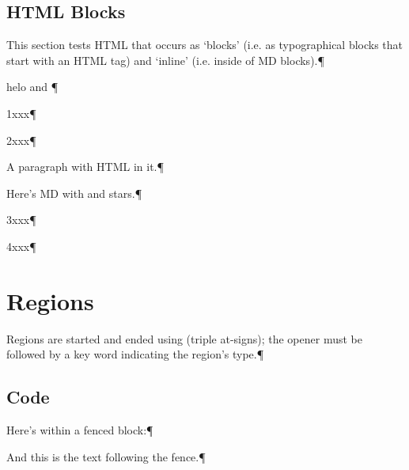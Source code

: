 

\section{HTML Blocks
}
This section tests HTML that occurs as ‘blocks’ (i.e. as typographical blocks
that start with an HTML tag) and ‘inline’ (i.e. inside of MD blocks).¶\par
helo  and ¶\par
1xxx¶\par
2xxx¶\par
A paragraph with  HTML in it.¶\par
Here’s MD with  and  stars.¶\par
3xxx¶\par
4xxx¶\par

\chapter{Regions
}
Regions are started and ended using  (triple at-signs); the opener
must be followed by a key word indicating the region’s type.¶\par

\section{Code
}
Here’s  within a fenced block:¶\par
\begingroup\obeyalllines{}\endgroup{}And this is the text following the fence.¶\par
